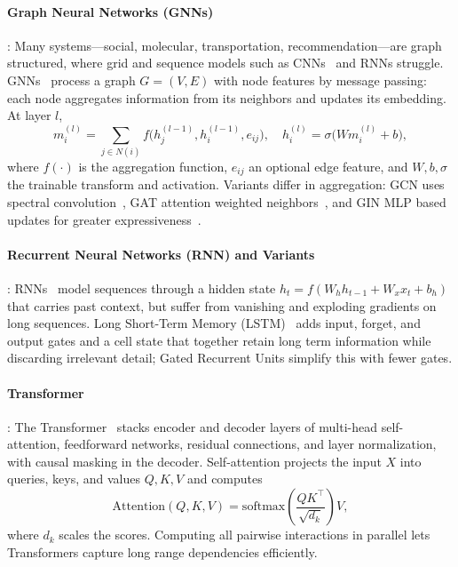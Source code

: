 \documentclass[journal]{IEEEtran}
\begin{document}
\paragraph{Graph Neural Networks (GNNs)}: Many systems---social, molecular, transportation, recommendation---are graph structured, where grid and sequence models such as CNNs~\cite{lecun1998cnn} and RNNs struggle. GNNs~\cite{scarselli2009gnn} process a graph $G=(V,E)$ with node features by message passing: each node aggregates information from its neighbors and updates its embedding. At layer $l$,
\begin{equation}
m_i^{(l)} = \sum_{j \in N(i)} f\bigl(h_j^{(l-1)}, h_i^{(l-1)}, e_{ij}\bigr), \quad h_i^{(l)} = \sigma\bigl(W m_i^{(l)} + b\bigr),
\end{equation}
where $f(\cdot)$ is the aggregation function, $e_{ij}$ an optional edge feature, and $W,b,\sigma$ the trainable transform and activation. Variants differ in aggregation: GCN uses spectral convolution~\cite{kipf2017gcn}, GAT attention weighted neighbors~\cite{velickovic2018gat}, and GIN MLP based updates for greater expressiveness~\cite{xu2019gin}.

\paragraph{Recurrent Neural Networks (RNN) and Variants}: RNNs~\cite{rumelhart1986rnn} model sequences through a hidden state $h_t = f(W_h h_{t-1} + W_x x_t + b_h)$ that carries past context, but suffer from vanishing and exploding gradients on long sequences. Long Short-Term Memory (LSTM)~\cite{rnn_lstm} adds input, forget, and output gates and a cell state that together retain long term information while discarding irrelevant detail; Gated Recurrent Units simplify this with fewer gates.

\paragraph{Transformer}: The Transformer~\cite{vaswani2017attention} stacks encoder and decoder layers of multi-head self-attention, feedforward networks, residual connections, and layer normalization, with causal masking in the decoder. Self-attention projects the input $X$ into queries, keys, and values $Q,K,V$ and computes
\begin{equation}
\mathrm{Attention}(Q,K,V) = \mathrm{softmax}\!\left(\frac{QK^\top}{\sqrt{d_k}}\right) V,
\end{equation}
where $d_k$ scales the scores. Computing all pairwise interactions in parallel lets Transformers capture long range dependencies efficiently.
\end{document}
